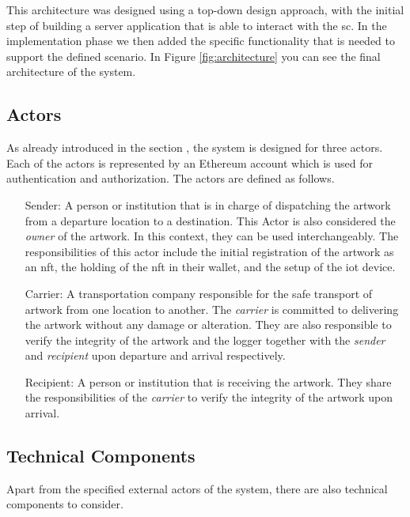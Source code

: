 This architecture was designed using a top-down design approach, with the initial step of building a server application that is able to interact with the \gls{sc}. In the implementation phase we then added the specific functionality that is needed to support the defined scenario. In Figure \ref{fig:architecture} you can see the final architecture of the system. 

\subsection{Actors}
As already introduced in the section , the system is designed for three actors. Each of the actors is represented by an Ethereum account which is used for authentication and authorization. The actors are defined as follows.

\begin{itemize}[align=left, font=\itshape]
    \item[Sender:] A person or institution that is in charge of dispatching the artwork from a departure location to a destination. This Actor is also considered the \textit{owner} of the artwork. In this context, they can be used interchangeably. The responsibilities of this actor include the initial registration of the artwork as an \gls{nft}, the holding of the \gls{nft} in their \gls{wallet}, and the setup of the \gls{iot} device.

    \item[Carrier:] A transportation company responsible for the safe transport of artwork from one location to another. The \textit{carrier} is committed to delivering the artwork without any damage or alteration. They are also responsible to verify the integrity of the artwork and the logger together with the \textit{sender} and \textit{recipient} upon departure and arrival respectively.

    \item[Recipient:] A person or institution that is receiving the artwork. They share the responsibilities of the \textit{carrier} to verify the integrity of the artwork upon arrival. 
\end{itemize}

\subsection{Technical Components}
Apart from the specified external actors of the system, there are also technical components to consider.

